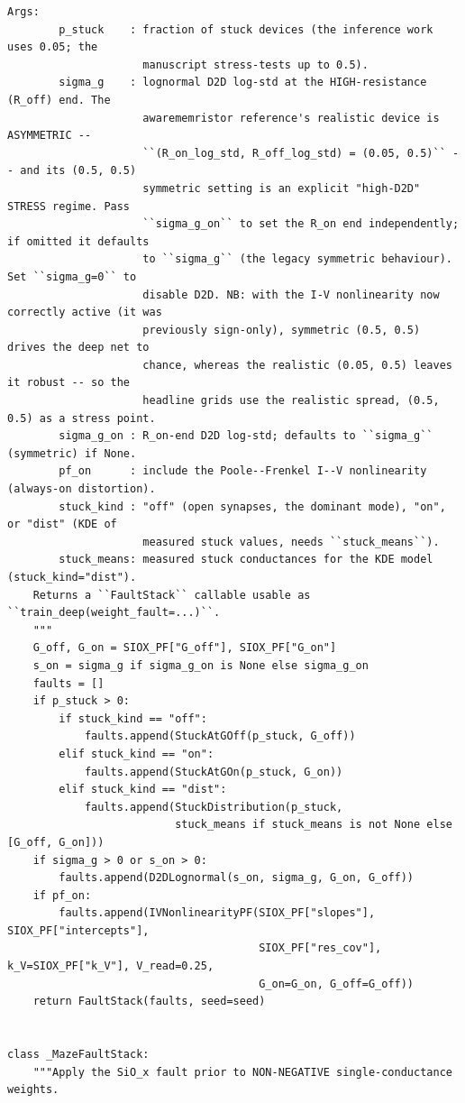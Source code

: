 \begin{lstlisting}[caption={mrl\_trace/device\_faults.py},label={lst:siox-src-device_faults}]
    Args:
        p_stuck    : fraction of stuck devices (the inference work uses 0.05; the
                     manuscript stress-tests up to 0.5).
        sigma_g    : lognormal D2D log-std at the HIGH-resistance (R_off) end. The
                     awarememristor reference's realistic device is ASYMMETRIC --
                     ``(R_on_log_std, R_off_log_std) = (0.05, 0.5)`` -- and its (0.5, 0.5)
                     symmetric setting is an explicit "high-D2D" STRESS regime. Pass
                     ``sigma_g_on`` to set the R_on end independently; if omitted it defaults
                     to ``sigma_g`` (the legacy symmetric behaviour). Set ``sigma_g=0`` to
                     disable D2D. NB: with the I-V nonlinearity now correctly active (it was
                     previously sign-only), symmetric (0.5, 0.5) drives the deep net to
                     chance, whereas the realistic (0.05, 0.5) leaves it robust -- so the
                     headline grids use the realistic spread, (0.5, 0.5) as a stress point.
        sigma_g_on : R_on-end D2D log-std; defaults to ``sigma_g`` (symmetric) if None.
        pf_on      : include the Poole--Frenkel I--V nonlinearity (always-on distortion).
        stuck_kind : "off" (open synapses, the dominant mode), "on", or "dist" (KDE of
                     measured stuck values, needs ``stuck_means``).
        stuck_means: measured stuck conductances for the KDE model (stuck_kind="dist").
    Returns a ``FaultStack`` callable usable as ``train_deep(weight_fault=...)``.
    """
    G_off, G_on = SIOX_PF["G_off"], SIOX_PF["G_on"]
    s_on = sigma_g if sigma_g_on is None else sigma_g_on
    faults = []
    if p_stuck > 0:
        if stuck_kind == "off":
            faults.append(StuckAtGOff(p_stuck, G_off))
        elif stuck_kind == "on":
            faults.append(StuckAtGOn(p_stuck, G_on))
        elif stuck_kind == "dist":
            faults.append(StuckDistribution(p_stuck,
                          stuck_means if stuck_means is not None else [G_off, G_on]))
    if sigma_g > 0 or s_on > 0:
        faults.append(D2DLognormal(s_on, sigma_g, G_on, G_off))
    if pf_on:
        faults.append(IVNonlinearityPF(SIOX_PF["slopes"], SIOX_PF["intercepts"],
                                       SIOX_PF["res_cov"], k_V=SIOX_PF["k_V"], V_read=0.25,
                                       G_on=G_on, G_off=G_off))
    return FaultStack(faults, seed=seed)


class _MazeFaultStack:
    """Apply the SiO_x fault prior to NON-NEGATIVE single-conductance weights.


\end{lstlisting}
